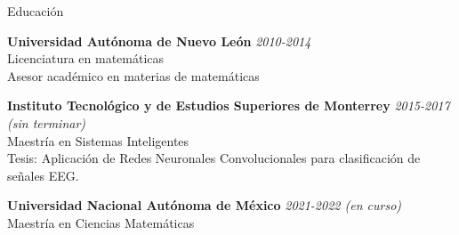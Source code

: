 \documentclass{resume} %
\begin{document}

\begin{rSection}{Educación}

{\bf Universidad Autónoma de Nuevo León} \hfill {\em 2010-2014} \\ 
Licenciatura en matemáticas \\
Asesor académico en materias de matemáticas \smallskip 

{\bf Instituto Tecnológico y de Estudios Superiores de Monterrey} \hfill {\em 2015-2017 (sin terminar)} \\
Maestría en Sistemas Inteligentes\\
Tesis: Aplicación de Redes Neuronales Convolucionales para clasificación de señales EEG. \smallskip 

{\bf Universidad Nacional Autónoma de México} \hfill {\em 2021-2022 (en curso)} \\
Maestría en Ciencias Matemáticas
\end{rSection}

\end{document}

